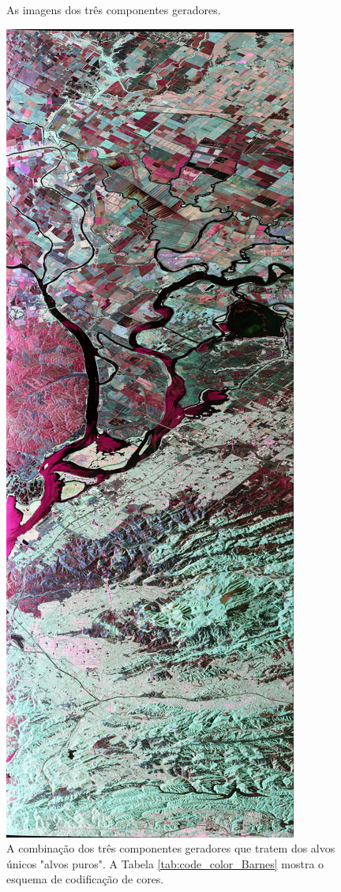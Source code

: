 \documentclass{article}
\begin{document}
\begin{figure}[H]
    \caption{As imagens dos três componentes geradores.}
\end{figure}

\begin{figure}[H]
    \centering
    \includegraphics[width=.4\linewidth]{Images/Holmes.png}
    \caption{A combinação dos três componentes geradores que tratem dos alvos únicos "alvos puros". A Tabela \ref{tab:code_color_Barnes} mostra o esquema de codificação de cores.}
    \label{fig:Barnes}
\end{figure}
\end{document}
